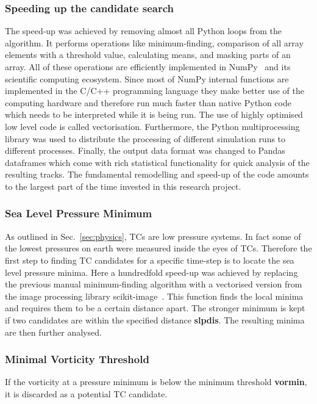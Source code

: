 \subsubsection*{Speeding up the candidate search}
The speed-up was achieved by removing almost all Python loops from the algorithm. It performs operations like minimum-finding, comparison of all array elements with a threshold value, calculating means, and masking parts of an array. All of these operations are efficiently implemented in NumPy~\cite{numpy} and its scientific computing ecosystem. Since most of NumPy internal functions are implemented in the C/C++ programming language they make better use of the computing hardware and therefore run much faster than native Python code which needs to be interpreted while it is being run. The use of highly optimised low level code is called vectorisation.
Furthermore, the Python multiprocessing library was used to distribute the processing of different simulation runs to different processes.\newline
Finally, the output data format was changed to Pandas dataframes which come with rich statistical functionality for quick analysis of the resulting tracks.\newline
The fundamental remodelling and speed-up of the code amounts to the largest part of the time invested in this research project.

\subsubsection*{Sea Level Pressure Minimum}
As outlined in Sec.~\ref{sec:physics}, TCs are low pressure systems. In fact
some of the lowest pressures on earth were measured inside the eyes of TCs.
Therefore the first step to finding TC candidates for a specific time-step is
to locate the sea level pressure minima. Here a hundredfold speed-up was achieved by
replacing the previous manual minimum-finding algorithm with a vectorised
version from the image processing library scikit-image~\cite{scikit-image}.
This function finds the local minima and requires them to be a certain distance
apart. The stronger minimum is kept if two candidates are within the specified
distance \textbf{slpdis}. The resulting minima are then further
analysed.
\subsubsection*{Minimal Vorticity Threshold}
If the vorticity at a pressure minimum is below the minimum threshold
\textbf{vormin}, it is discarded as a potential TC candidate.


